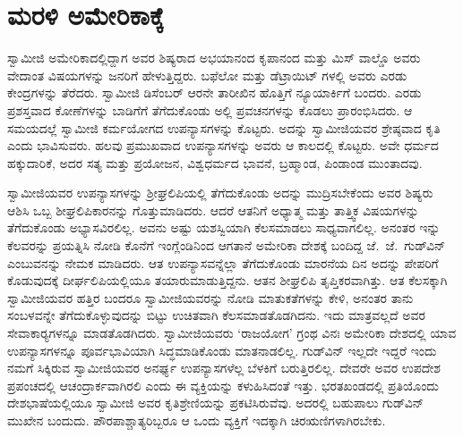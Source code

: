 
\chapter{ಮರಳಿ ಅಮೇರಿಕಾಕ್ಕೆ }

 ಸ್ವಾಮೀಜಿ ಅಮೇರಿಕಾದಲ್ಲಿದ್ದಾಗ ಅವರ ಶಿಷ್ಯರಾದ ಅಭಯಾನಂದ ಕೃಪಾನಂದ ಮತ್ತು ಮಿಸ್ ವಾಲ್ಡೊ ಅವರು ವೇದಾಂತ ವಿಷಯಗಳನ್ನು ಜನರಿಗೆ ಹೇಳುತ್ತಿದ್ದರು. ಬಫೆಲೋ ಮತ್ತು ಡೆಟ್ರಾಯಿಟ್ ಗಳಲ್ಲಿ ಅವರು ಎರಡು ಕೇಂದ್ರಗಳನ್ನು ತೆರೆದರು. ಸ್ವಾಮೀಜಿ ಡಿಸೆಂಬರ್ ಆರನೇ ತಾರೀಖಿನ ಹೊತ್ತಿಗೆ ನ್ಯೂಯಾರ್ಕಿಗೆ ಬಂದರು. ಎರಡು ಪ್ರಶಸ್ತವಾದ ಕೋಣೆಗಳನ್ನು ಬಾಡಿಗೆಗೆ ತೆಗೆದುಕೊಂಡು ಅಲ್ಲಿ ಪ್ರವಚನಗಳನ್ನು ಕೊಡಲು ಪ್ರಾರಂಭಿಸಿದರು. ಆ ಸಮಯದಲ್ಲೆ ಸ್ವಾಮೀಜಿ ಕರ್ಮಯೋಗದ ಉಪನ್ಯಾಸಗಳನ್ನು ಕೊಟ್ಟರು. ಅದನ್ನು ಸ್ವಾಮೀಜಿಯವರ ಶ್ರೇಷ್ಠವಾದ ಕೃತಿ ಎಂದು ಭಾವಿಸುವರು. ಹಲವು ಪ್ರಮುಖವಾದ ಉಪನ್ಯಾಸಗಳನ್ನು ಅವರು ಆ ಕಾಲದಲ್ಲಿ ಕೊಟ್ಟರು. ಅವೇ ಧರ್ಮದ ಹಕ್ಕುದಾರಿಕೆ, ಅದರ ಸತ್ಯ ಮತ್ತು ಪ್ರಯೋಜನ, ವಿಶ್ವಧರ್ಮದ ಭಾವನೆ, ಬ್ರಹ್ಮಾಂಡ, ಪಿಂಡಾಂಡ ಮುಂತಾದವು. 

 ಸ್ವಾಮೀಜಿಯವರ ಉಪನ್ಯಾಸಗಳನ್ನು ಶ‍್ರೀಘ್ರಲಿಪಿಯಲ್ಲಿ ತೆಗೆದುಕೊಂಡು ಅದನ್ನು ಮುದ್ರಿಸಬೇಕೆಂದು ಅವರ ಶಿಷ್ಯರು ಆಶಿಸಿ ಒಬ್ಬ ಶೀಘ್ರಲಿಪಿಕಾರನನ್ನು ಗೊತ್ತುಮಾಡಿದರು. ಆದರೆ ಆತನಿಗೆ ಅಧ್ಯಾತ್ಮ ಮತ್ತು ತಾತ್ತ್ವಿಕ ವಿಷಯಗಳನ್ನು ತೆಗೆದುಕೊಂಡು ಅಭ್ಯಾಸವಿರಲಿಲ್ಲ. ಅವನು ಅಷ್ಟು ಯಶಸ್ವಿಯಾಗಿ ಕೆಲಸಮಾಡಲು ಸಾಧ್ಯವಾಗಲಿಲ್ಲ. ಅನಂತರ ಇನ್ನು ಕೆಲವರನ್ನು ಪ್ರಯತ್ನಿಸಿ ನೋಡಿ ಕೊನೆಗೆ ಇಂಗ್ಲೆಂಡಿನಿಂದ ಆಗತಾನೆ ಅಮೇರಿಕಾ ದೇಶಕ್ಕೆ ಬಂದಿದ್ದ ಜೆ.~ಜೆ.~ಗುಡ್‍ವಿನ್ ಎಂಬುವನನ್ನು ನೇಮಕ ಮಾಡಿದರು. ಆತ ಉಪನ್ಯಾಸವನ್ನೆಲ್ಲಾ ತೆಗೆದುಕೊಂಡು ಮಾರನೆಯ ದಿನ ಅದನ್ನು ಪೇಪರಿಗೆ ಕೊಡುವುದಕ್ಕೆ ದೀರ್ಘಲಿಪಿಯಲ್ಲಿಯೂ ತಯಾರುಮಾಡುತ್ತಿದ್ದನು. ಆತನ ಶೀಘ್ರಲಿಪಿ ತೃಪ್ತಿಕರವಾಗಿತ್ತು. ಆತ ಕೆಲಸಕ್ಕಾಗಿ ಸ್ವಾಮೀಜಿಯವರ ಹತ್ತಿರ ಬಂದರೂ ಸ್ವಾಮೀಜಿಯವರನ್ನು ನೋಡಿ ಮಾತುಕತೆಗಳನ್ನು ಕೇಳಿ, ಅನಂತರ ತಾನು ಸಂಬಳವನ್ನೇ ತೆಗೆದುಕೊಳ್ಳುವುದನ್ನು ಬಿಟ್ಟು ಉಚಿತವಾಗಿ ಕೆಲಸಮಾಡತೊಡಗಿದನು. ಇದು ಮಾತ್ರವಲ್ಲದೆ ಅವರ ಸೇವಾಕಾರ‍್ಯಗಳನ್ನೂ ಮಾಡತೊಡಗಿದರು. ಸ್ವಾಮೀಜಿಯವರು ‘ರಾಜಯೋಗ’ ಗ್ರಂಥ ವಿನಃ ಅಮೇರಿಕಾ ದೇಶದಲ್ಲಿ ಯಾವ ಉಪನ್ಯಾಸಗಳನ್ನೂ ಪೂರ್ವಭಾವಿಯಾಗಿ ಸಿದ್ಧಮಾಡಿಕೊಂಡು ಮಾತನಾಡಲಿಲ್ಲ. ಗುಡ್‍ವಿನ್ ಇಲ್ಲದೇ ಇದ್ದರೆ ಇಂದು ನಮಗೆ ಸಿಕ್ಕಿರುವ ಸ್ವಾಮೀಜಿಯವರ ಅನರ್ಘ್ಯ ಉಪನ್ಯಾಸಗಳೆಲ್ಲ ಬೆಳಕಿಗೆ ಬರುತ್ತಿರಲಿಲ್ಲ. ದೇವರೇ ಅವರ ಉಪದೇಶ ಪ್ರಪಂಚದಲ್ಲಿ ಆಚಂದ್ರಾರ್ಕವಾಗಿರಲಿ ಎಂದು ಈ ವ್ಯಕ್ತಿಯನ್ನು ಕಳುಹಿಸಿದಂತೆ ಇತ್ತು. ಭರತಖಂಡದಲ್ಲಿ ಪ್ರತಿಯೊಂದು ದೇಶಭಾಷೆಯಲ್ಲಿಯೂ ಸ್ವಾಮೀಜಿ ಅವರ ಕೃತಿಶ್ರೇಣಿಯನ್ನು ಪ್ರಕಟಿಸಿರುವೆವು. ಅದರಲ್ಲಿ ಬಹುಪಾಲು ಗುಡ್‍ವಿನ್ ಮುಖೇನ ಬಂದುದು. ಪೌರಪಾಶ್ಚಾತ್ಯರಿಬ್ಬರೂ ಆ ಒಂದು ವ್ಯಕ್ತಿಗೆ ಇದಕ್ಕಾಗಿ ಚಿರಋಣಿಗಳಾಗಿರಬೇಕು. 

